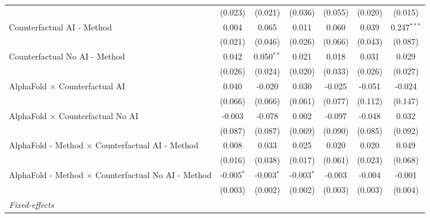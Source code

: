 \begin{tabular}{lcccccc}
                                                              & (0.023)       & (0.021)       & (0.036)       & (0.055)       & (0.020)       & (0.015)\\   
   Counterfactual AI - Method                                 & 0.004         & 0.065         & 0.011         & 0.060         & 0.039         & 0.247$^{***}$\\   
                                                              & (0.021)       & (0.046)       & (0.026)       & (0.066)       & (0.043)       & (0.087)\\   
   Counterfactual No AI - Method                              & 0.042         & 0.050$^{**}$  & 0.021         & 0.018         & 0.031         & 0.029\\   
                                                              & (0.026)       & (0.024)       & (0.020)       & (0.033)       & (0.026)       & (0.027)\\   
   AlphaFold $\times$ Counterfactual AI                       & 0.040         & -0.020        & 0.030         & -0.025        & -0.051        & -0.024\\   
                                                              & (0.066)       & (0.066)       & (0.061)       & (0.077)       & (0.112)       & (0.147)\\   
   AlphaFold $\times$ Counterfactual No AI                    & -0.003        & -0.078        & 0.002         & -0.097        & -0.048        & 0.032\\   
                                                              & (0.087)       & (0.087)       & (0.069)       & (0.090)       & (0.085)       & (0.092)\\   
   AlphaFold - Method $\times$ Counterfactual AI - Method     & 0.008         & 0.033         & 0.025         & 0.020         & 0.020         & 0.049\\   
                                                              & (0.016)       & (0.038)       & (0.017)       & (0.061)       & (0.023)       & (0.068)\\   
   AlphaFold - Method $\times$ Counterfactual No AI - Method  & -0.005$^{*}$  & -0.003$^{*}$  & -0.003$^{*}$  & -0.003        & -0.004        & -0.001\\   
                                                              & (0.003)       & (0.002)       & (0.002)       & (0.003)       & (0.003)       & (0.004)\\   
   \midrule
   \emph{Fixed-effects}\\

\end{tabular}
